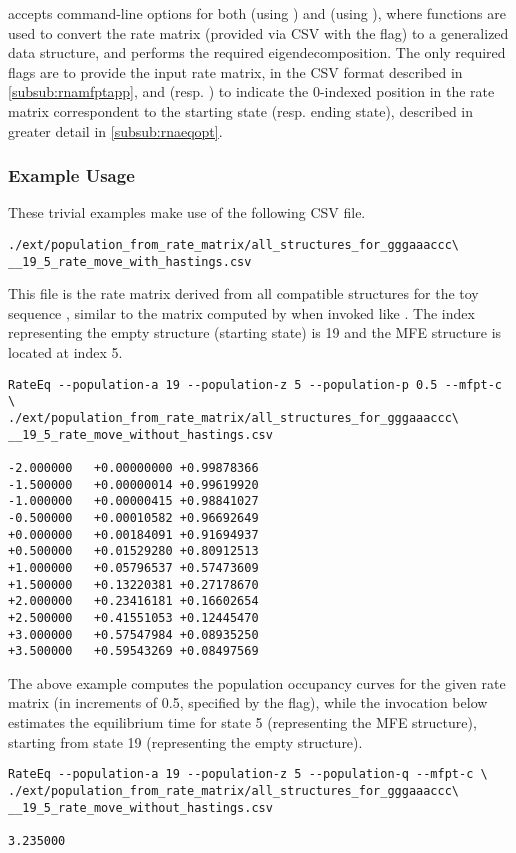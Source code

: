 \documentclass[11pt]{article}
\begin{document}
\rateeq accepts command-line options for both \rnamfpt (using ) and \rnaeq (using ), where \rnamfpt functions are used to convert the rate matrix (provided via CSV with the  flag) to a generalized data structure, and \rnaeq performs the required eigendecomposition. The only required flags are  to provide the input rate matrix, in the CSV format described in \ref{subsub:rnamfptapp}, and  (resp. ) to indicate the 0-indexed position in the rate matrix correspondent to the starting state (resp. ending state), described in greater detail in \ref{subsub:rnaeqopt}.

\subsubsection{Example Usage} \label{subsub:rateeqex}

These trivial examples make use of the following CSV file.

\begin{verbatim}
./ext/population_from_rate_matrix/all_structures_for_gggaaaccc\
__19_5_rate_move_with_hastings.csv
\end{verbatim}

This file is the rate matrix derived from all compatible structures for the toy sequence , similar to the matrix computed by \rnaeq when invoked like . The index representing the empty structure (starting state) is 19 and the MFE structure is located at index 5.

\begin{verbatim}
RateEq --population-a 19 --population-z 5 --population-p 0.5 --mfpt-c \
./ext/population_from_rate_matrix/all_structures_for_gggaaaccc\
__19_5_rate_move_without_hastings.csv

-2.000000	+0.00000000	+0.99878366
-1.500000	+0.00000014	+0.99619920
-1.000000	+0.00000415	+0.98841027
-0.500000	+0.00010582	+0.96692649
+0.000000	+0.00184091	+0.91694937
+0.500000	+0.01529280	+0.80912513
+1.000000	+0.05796537	+0.57473609
+1.500000	+0.13220381	+0.27178670
+2.000000	+0.23416181	+0.16602654
+2.500000	+0.41551053	+0.12445470
+3.000000	+0.57547984	+0.08935250
+3.500000	+0.59543269	+0.08497569
\end{verbatim}

The above example computes the population occupancy curves for the given rate matrix (in \logtime increments of 0.5, specified by the  flag), while the invocation below estimates the equilibrium time for state 5 (representing the MFE structure), starting from state 19 (representing the empty structure).

\begin{verbatim}
RateEq --population-a 19 --population-z 5 --population-q --mfpt-c \
./ext/population_from_rate_matrix/all_structures_for_gggaaaccc\
__19_5_rate_move_without_hastings.csv

3.235000
\end{verbatim}

\clearpage


\renewcommand{\refname}{\vskip -1cm}


\end{document}
